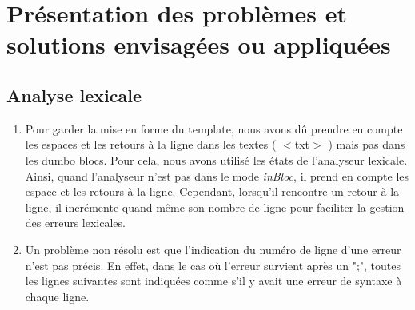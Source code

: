 \documentclass[a4paper, 12pt]{article}
\begin{document}
\section{Présentation des problèmes et solutions envisagées ou appliquées}
    \subsection{Analyse lexicale}
        \begin{enumerate}
            \item Pour garder la mise en forme du template, nous avons dû prendre en compte les espaces et les retours à la ligne dans les textes ( $<$txt$>$ )  mais pas dans les dumbo blocs. Pour cela, nous avons utilisé les états de l'analyseur lexicale. Ainsi, quand l'analyseur n'est pas dans le mode \textit{inBloc}, il prend en compte les espace et les retours à la ligne. Cependant, lorsqu'il rencontre un retour à la ligne, il incrémente quand même son nombre de ligne pour faciliter la gestion des erreurs lexicales.
            
            \item Un problème non résolu est que l'indication du numéro de ligne d'une erreur n'est pas précis. En effet, dans le cas où l'erreur survient après un ";", toutes les lignes suivantes sont indiquées comme s'il y avait une erreur de syntaxe à chaque ligne.
        \end{enumerate}
\end{document}
